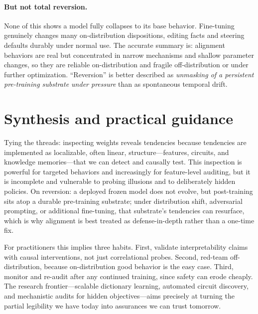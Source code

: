 \documentclass[11pt]{article}
\begin{document}
\paragraph{But not total reversion.} None of this shows a model fully collapses to its base behavior. Fine-tuning genuinely changes many on-distribution dispositions, editing facts and steering defaults durably under normal use. The accurate summary is: alignment behaviors are real but concentrated in narrow mechanisms and shallow parameter changes, so they are reliable on-distribution and fragile off-distribution or under further optimization. ``Reversion'' is better described as \emph{unmasking of a persistent pre-training substrate under pressure} than as spontaneous temporal drift.

\section{Synthesis and practical guidance}
Tying the threads: inspecting weights reveals tendencies because tendencies are implemented as localizable, often linear, structure---features, circuits, and knowledge memories---that we can detect and causally test. This inspection is powerful for targeted behaviors and increasingly for feature-level auditing, but it is incomplete and vulnerable to probing illusions and to deliberately hidden policies. On reversion: a deployed frozen model does not evolve, but post-training sits atop a durable pre-training substrate; under distribution shift, adversarial prompting, or additional fine-tuning, that substrate's tendencies can resurface, which is why alignment is best treated as defense-in-depth rather than a one-time fix.

For practitioners this implies three habits. First, validate interpretability claims with causal interventions, not just correlational probes. Second, red-team off-distribution, because on-distribution good behavior is the easy case. Third, monitor and re-audit after any continued training, since safety can erode cheaply. The research frontier---scalable dictionary learning, automated circuit discovery, and mechanistic audits for hidden objectives---aims precisely at turning the partial legibility we have today into assurances we can trust tomorrow.



\end{document}
